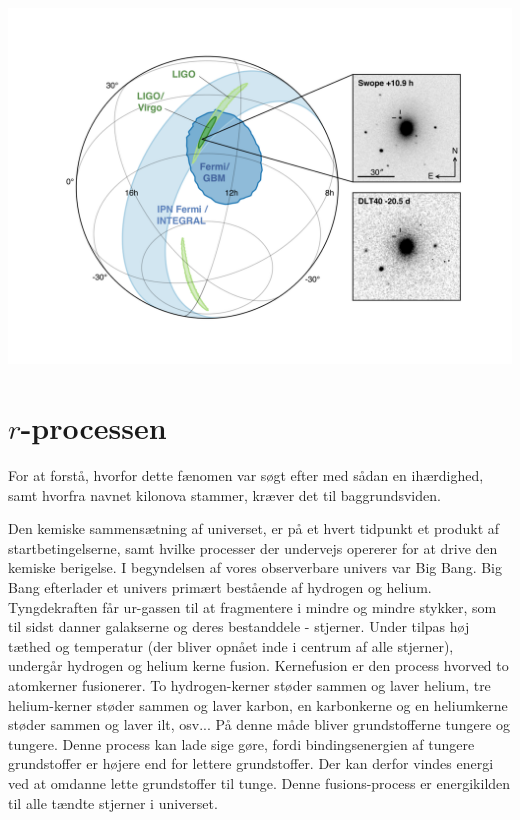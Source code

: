 \documentclass[twocolumn]{article}
\begin{document}
\begin{center}
\includegraphics[width=\columnwidth]{GW170817_MMA_Skymap} \label{fig1}
\end{center}





\section{$r$-processen}\label{rproc}

For at forstå, hvorfor dette fænomen var søgt efter med sådan en ihærdighed, samt hvorfra navnet kilonova stammer, kræver det til baggrundsviden. 

Den kemiske sammensætning af universet, er på et hvert tidpunkt et produkt af startbetingelserne, samt hvilke processer der undervejs opererer for at drive den kemiske berigelse. I begyndelsen af vores observerbare univers var Big Bang. Big Bang efterlader et univers primært bestående af hydrogen og helium. Tyngdekraften får ur-gassen til at fragmentere i mindre og mindre stykker, som til sidst danner galakserne og deres bestanddele - stjerner. Under tilpas høj tæthed og temperatur (der bliver opnået inde i centrum af alle stjerner), undergår hydrogen og helium kerne fusion. Kernefusion er den process hvorved to atomkerner fusionerer. To hydrogen-kerner støder sammen og laver helium, tre helium-kerner støder sammen og laver karbon, en karbonkerne og en heliumkerne støder sammen og laver ilt, osv... På denne måde bliver grundstofferne tungere og tungere. Denne process kan lade sige gøre, fordi bindingsenergien af tungere grundstoffer er højere end for lettere grundstoffer. Der kan derfor vindes energi ved at omdanne lette grundstoffer til tunge. Denne fusions-process er energikilden til alle tændte stjerner i universet. 
\end{document}
